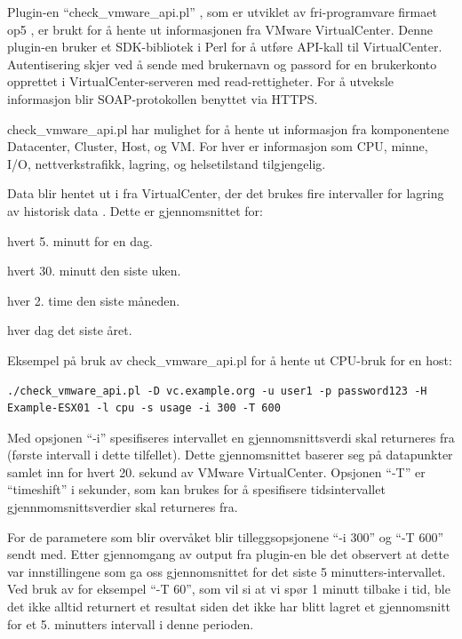 Plugin-en ``check\_vmware\_api.pl'' , som er utviklet av fri-programvare firmaet op5 \cite{op5}, er brukt for å hente ut informasjonen fra VMware VirtualCenter. Denne plugin-en bruker et SDK-bibliotek i Perl \cite{vmwareperl} for å utføre API-kall til VirtualCenter. Autentisering skjer ved å sende med brukernavn og passord for en brukerkonto opprettet i VirtualCenter-serveren med read-rettigheter. For å utveksle informasjon blir SOAP-protokollen benyttet \cite{wiki:soap} via HTTPS.

check\_vmware\_api.pl har mulighet for å hente ut informasjon fra komponentene Datacenter, Cluster, Host, og VM. For hver er informasjon som CPU, minne, I/O, nettverkstrafikk, lagring, og helsetilstand tilgjengelig.

Data blir hentet ut i fra VirtualCenter, der det brukes fire intervaller for lagring av historisk data \cite{vmwareperf}. Dette er gjennomsnittet for:
\begin{enumerate*}
        \item hvert 5. minutt for en dag.
        \item hvert 30. minutt den siste uken.
        \item hver 2. time den siste måneden.
        \item hver dag det siste året.
\end{enumerate*}

Eksempel på bruk av check\_vmware\_api.pl for å hente ut CPU-bruk for en host:
\begin{lstlisting}[style=example]
./check_vmware_api.pl -D vc.example.org -u user1 -p password123 -H Example-ESX01 -l cpu -s usage -i 300 -T 600
\end{lstlisting}

Med opsjonen ``-i'' spesifiseres intervallet en gjennomsnittsverdi skal returneres fra (første intervall i dette tilfellet). Dette gjennomsnittet baserer seg på datapunkter samlet inn for hvert 20. sekund av VMware VirtualCenter. Opsjonen ``-T''  er ``timeshift'' i sekunder, som kan brukes for å spesifisere tidsintervallet gjennmomsnittsverdier skal returneres fra. 

For de parametere som blir overvåket blir tilleggsopsjonene ``-i 300'' og ``-T 600'' sendt med. Etter gjennomgang av output fra plugin-en ble det observert at dette var innstillingene som ga oss gjennomsnittet for det siste 5 minutters-intervallet. Ved bruk av for eksempel ``-T 60'', som vil si at vi spør 1 minutt tilbake i tid, ble det ikke alltid returnert et resultat siden det ikke har blitt lagret et gjennomsnitt for et 5. minutters intervall i denne perioden. 

